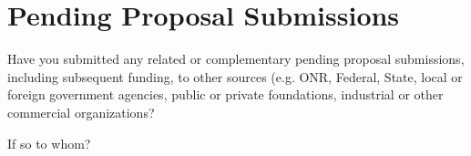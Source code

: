 \section{Pending Proposal Submissions}

Have you submitted any related or complementary pending proposal submissions, including subsequent funding, to other sources (e.g. ONR, Federal, State, local or foreign government agencies, public or private foundations, industrial or other commercial organizations?

If so to whom?


